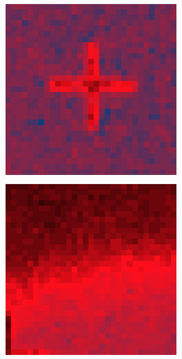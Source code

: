\documentclass[10pt]{scrartcl}
\begin{document}
\begin{figure}[!ht]
    \begin{subfigure}[b]{.3\linewidth}
        \centering
        \includegraphics[width=1.2\linewidth]{../plots_tables_images/1d1dcrop_2_5.eps}
    \end{subfigure}
    \begin{subfigure}[b]{.3\linewidth}
        \centering
        \includegraphics[width=1.2\linewidth]{../plots_tables_images/1d1dcrop_2_9.eps}

\end{subfigure}
\end{figure}
\end{document}
